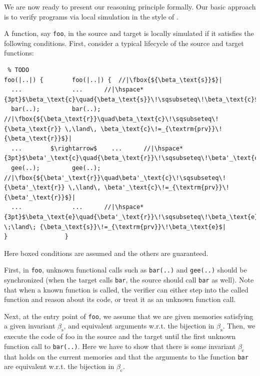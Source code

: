 We are now ready to present our reasoning principle formally. Our
basic approach is to verify programs via local simulation in the style
of \cite{Hur:2012:MBK:2103656.2103666}.


A function, say \texttt{foo}, in the source and target is locally
simulated if it satisfies the following conditions.  First, consider
a typical lifecycle of the source and target functions:
\begin{center}
\begin{minipage}{0.475\textwidth}
\begin{lstlisting} % TODO
foo(|..|) {        foo(|..|) {  //|\fbox{${\beta_\text{s}}$}|
  ...              ...      //|\hspace*{3pt}$\beta_\text{c}\quad{\beta_\text{s}}\!\sqsubseteq\!\beta_\text{c}$|
  bar(..);         bar(..); //|\fbox{${\beta_\text{r}}\quad\beta_\text{c}\!\sqsubseteq\!{\beta_\text{r}} \,\land\, \beta_\text{c}\!=_{\textrm{prv}}\!{\beta_\text{r}}$}|
  ...        $\rightarrow$    ...      //|\hspace*{3pt}$\beta'_\text{c}\quad{\beta_\text{r}}\!\sqsubseteq\!\beta'_\text{c}$|
  gee(..);         gee(..); //|\fbox{${\beta'_\text{r}}\quad\beta'_\text{c}\!\sqsubseteq\!{\beta'_\text{r}} \,\land\, \beta'_\text{c}\!=_{\textrm{prv}}\!{\beta'_\text{r}}$}|
  ...              ...      //|\hspace*{3pt}$\beta_\text{e}\quad{\beta'_\text{r}}\!\sqsubseteq\!\beta_\text{e} \;\land\; {\beta_\text{s}}\!=_{\textrm{prv}}\!\beta_\text{e}$|
}                }
\end{lstlisting}
\end{minipage}
\end{center}
Here boxed conditions are assumed and the others are guaranteed.

First, in \texttt{foo}, unknown functional calls such as
\texttt{bar(..)} and \texttt{gee(..)} should be synchronized (\ie when
the target calls \texttt{bar}, the source should call \texttt{bar} as
well). Note that when a known function is called, the verifier can either step into
the called function and reason about its code, or treat
it as an unknown function call.

Next, at the entry point of \texttt{foo}, we assume that we are given
memories satisfying a given invariant $\beta_\textrm{s}$, and
equivalent arguments w.r.t. the bijection in $\beta_\textrm{s}$.
Then, we execute the code of \textrm{foo} in the source and the target
until the first unknown function call to \texttt{bar(..)}.  Here we have
to show that there is some invariant $\beta_\textrm{c}$ that holds on
the current memories and that the arguments to the function \texttt{bar}
are equivalent w.r.t. the bijection in $\beta_\textrm{c}$.

